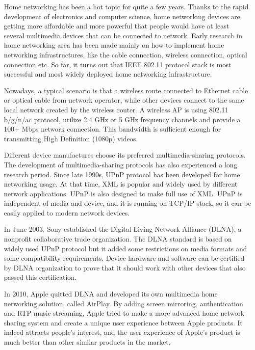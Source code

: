 
Home networking has been a hot topic for quite a few years. Thanks to the rapid development of electronics and computer science, home networking devices are getting more affordable and more powerful that people would have at least several multimedia devices that can be connected to network.
Early research in home networking area has been made mainly on how to implement home networking infrastructures, like the cable connection, wireless connection, optical connection etc. So far, it turns out that IEEE 802.11 protocol stack is most successful and most widely deployed home networking infrastructure.

Nowadays, a typical scenario is that a wireless route connected to Ethernet cable or optical cable from network operator, while other devices connect to the same local network created by the wireless router. A wireless AP is using 802.11 b/g/n/ac protocol, utilize 2.4 GHz or 5 GHz frequency channels and provide a 100+ Mbps network connection. This bandwidth is sufficient enough for transmitting High Definition (1080p) videos.

Different device manufactures choose its preferred multimedia-sharing protocols. The development of multimedia-sharing protocols has also experienced a long research period. Since late 1990s, UPnP protocol has been developed for home networking usage. At that time, XML is popular and widely used by different network applications. UPnP is also designed to make full use of XML. UPnP is independent of media and device, and it is running on TCP/IP stack, so it can be easily applied to modern network devices. 

In June 2003, Sony established the Digital Living Network Alliance (DLNA), a nonprofit collaborative trade organization. The DLNA standard is based on widely used UPnP protocol but it added some restrictions on media formats and some compatibility requirements. Device hardware and software can be certified by DLNA organization to prove that it should work with other devices that also passed this certification.

In 2010, Apple quitted DLNA and developed its own multimedia home networking solution, called AirPlay. By adding screen mirroring, authentication and RTP music streaming, Apple tried to make a more advanced home network sharing system and create a unique user experience between Apple products. It indeed attracts people's interest, and the user experience of Apple's product is much better than other similar products in the market. 

